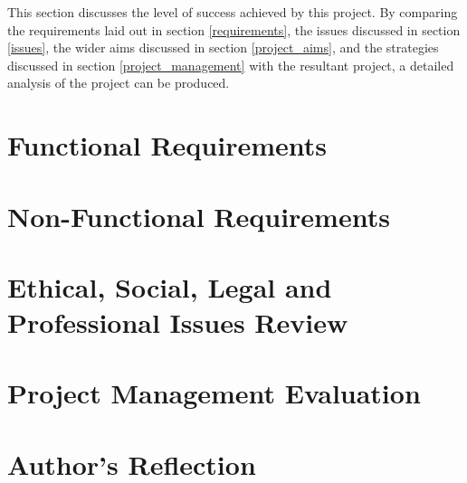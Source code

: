 This section discusses the level of success achieved by this project. By comparing the requirements laid out in section \ref{requirements}, the issues discussed in section \ref{issues}, the wider aims discussed in section \ref{project_aims}, and the strategies discussed in section \ref{project_management} with the resultant project, a detailed analysis of the project can be produced.

\section{Functional Requirements}
\label{evaluation_functional_requirements}


\section{Non-Functional Requirements}
\label{evaluation_non_functional_requirements}


\section{Ethical, Social, Legal and Professional Issues Review}
\label{ethical_social_legal_and_professional_issues_review}


\section{Project Management Evaluation}
\label{evaluation_project_management}


\section{Author's Reflection}
\label{authors_reflection}

